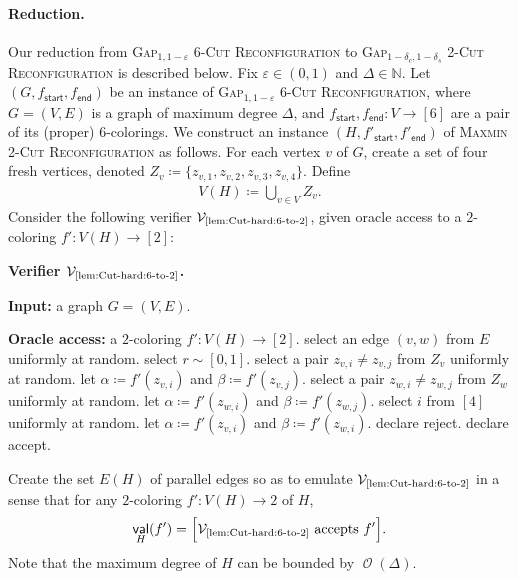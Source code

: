 \documentclass[11pt,fleqn]{article}
\renewcommand{\leq}{\leqslant}
\renewcommand{\epsilon}{\varepsilon}
\newcommand{\prb}[1]{\textsc{#1}\xspace}
\newcommand{\defeq}{\coloneq}
\DeclareMathOperator{\bigO}{\mathcal{O}}
\DeclareMathOperator{\val}{\mathsf{val}}
\newcommand{\sss}{\mathsf{start}}
\newcommand{\ttt}{\mathsf{end}}
\newcommand{\V}{\calV}
\newcommand{\Accept}{\textsf{accept}\xspace}
\newcommand{\Reject}{\textsf{reject}\xspace}
\newcommand{\f}{f}
\newcommand{\Vsix}{\V_{\text{\ref{lem:Cut-hard:6-to-2}}}}
\newcommand{\twoCutReconf}{\prb{2-Cut Reconfiguration}}
\newcommand{\sixCutReconf}{\prb{6-Cut Reconfiguration}}
\newcommand{\MMtwoCutReconf}{\prb{Maxmin 2-Cut Reconfiguration}}
\newcommand{\calV}{\mathcal{V}}
\newcommand{\bbN}{\mathbb{N}}
\let\Pr\relax\DeclareMathOperator*{\Pr}{\mathbb{P}}
\theoremstyle{definition}
\numberwithin{equation}{section}
\begin{document}
\paragraph{Reduction.}
Our reduction from \prb{Gap$_{1,1-\epsilon}$ \sixCutReconf} to \prb{Gap$_{1-\delta_c,1-\delta_s}$ \twoCutReconf}
is described below.
Fix $\epsilon \in (0,1)$ and $\Delta \in \bbN$.
Let $(G,\f_\sss,\f_\ttt)$ be an instance of
\prb{Gap$_{1,1-\epsilon}$ \sixCutReconf}, where 
$G=(V,E)$ is a graph of maximum degree $\Delta$, and
$\f_\sss,\f_\ttt \colon V \to [6]$ are a pair of its (proper) $6$-colorings.
We construct an instance $(H,\f'_\sss,\f'_\ttt)$ of \MMtwoCutReconf as follows.
For each vertex $v$ of $G$, create a set of four fresh vertices,
denoted $Z_v \defeq \{z_{v,1}, z_{v,2}, z_{v,3}, z_{v,4}\}$.
Define
\begin{align}
    V(H) \defeq \bigcup_{v \in V} Z_v.
\end{align}
Consider the following verifier $\Vsix$,
given oracle access to a $2$-coloring $\f' \colon V(H) \to [2]$:
\begin{itembox}[l]{\textbf{Verifier $\Vsix$.}}
\begin{algorithmic}[1]
    \item[\textbf{Input:}]
        a graph $G=(V,E)$.
    \item[\textbf{Oracle access:}]
        a $2$-coloring $\f' \colon V(H) \to [2]$.
    \State select an edge $(v,w)$ from $E$ uniformly at random.
    \State select $r \sim [0,1]$.
    \If{$0 \leq r < \frac{4}{9}$} 
        \State select a pair $z_{v,i} \neq z_{v,j}$ from $Z_v$ uniformly at random.
        \State let $\alpha \defeq \f'(z_{v,i})$ and $\beta \defeq \f'(z_{v,j})$.
    \ElsIf{$\frac{4}{9} \leq r < \frac{8}{9}$} 
        \State select a pair $z_{w,i} \neq z_{w,j}$ from $Z_w$ uniformly at random.
        \State let $\alpha \defeq \f'(z_{w,i})$ and $\beta \defeq \f'(z_{w,j})$.
    \Else {}
        \State select $i$ from $[4]$ uniformly at random.
        \State let $\alpha \defeq \f'(z_{v,i})$ and $\beta \defeq \f'(z_{w,i})$.
    \EndIf
    \If{$\alpha = \beta$}
        \State declare \Reject.
    \Else
        \State declare \Accept.
    \EndIf
\end{algorithmic}
\end{itembox}

Create the set $E(H)$ of parallel edges so as to emulate $\Vsix$
in a sense that 
for any $2$-coloring $\f' \colon V(H) \to 2$ of $H$,
\begin{align}
    \val_H(\f') = \Pr\Bigl[ \Vsix \text{ accepts } \f' \Bigr].
\end{align}
Note that the maximum degree of $H$ can be bounded by $\bigO(\Delta)$.
\end{document}
